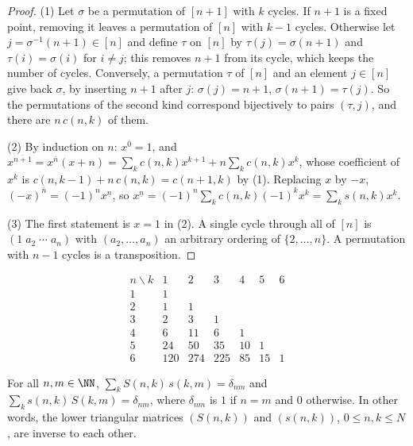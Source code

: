 \begin{proof}
(1) Let $\sigma$ be a permutation of $[n + 1]$ with $k$ cycles. If $n + 1$ is a fixed point, removing it leaves a permutation of $[n]$ with $k - 1$ cycles. Otherwise let $j = \sigma^{-1}(n + 1) \in [n]$ and
define $\tau$ on $[n]$ by $\tau(j) = \sigma(n + 1)$ and $\tau(i) = \sigma(i)$ for $i \neq j$; this removes $n + 1$ from its cycle, which keeps the number of cycles. Conversely, a permutation $\tau$ of $[n]$
and an element $j \in [n]$ give back $\sigma$, by inserting $n + 1$ after $j$: $\sigma(j) = n + 1$, $\sigma(n + 1) = \tau(j)$. So the permutations of the second kind correspond bijectively to pairs $(\tau, j)$,
and there are $n\,c(n, k)$ of them.

(2) By induction on $n$: $x^{\overline{0}} = 1$, and
$x^{\overline{n+1}} = x^{\overline{n}}(x + n) = \sum_kc(n, k)x^{k+1} + n\sum_kc(n, k)x^k$, whose coefficient of $x^k$ is $c(n, k - 1) + n\,c(n, k) = c(n + 1, k)$ by (1). Replacing $x$ by $-x$,
$(-x)^{\overline{n}} = (-1)^nx^{\underline{n}}$, so $x^{\underline{n}} = (-1)^n\sum_kc(n, k)(-1)^kx^k = \sum_ks(n, k)x^k$.

(3) The first statement is $x = 1$ in (2). A single cycle through all of $[n]$ is $(1 \; a_2 \; \cdots \; a_n)$ with $(a_2, \ldots, a_n)$ an arbitrary ordering of $\{2, \ldots, n\}$. A permutation with
$n - 1$ cycles is a transposition.
\end{proof}

\[
\begin{array}{c|cccccc}
n \backslash k & 1 & 2 & 3 & 4 & 5 & 6 \\ \hline
1 & 1 & & & & & \\
2 & 1 & 1 & & & & \\
3 & 2 & 3 & 1 & & & \\
4 & 6 & 11 & 6 & 1 & & \\
5 & 24 & 50 & 35 & 10 & 1 & \\
6 & 120 & 274 & 225 & 85 & 15 & 1
\end{array}
\]

\begin{corollary}[Orthogonality]\label{combinatorics:corollary-stirling-orthogonality}
For all $n, m \in \NN$, $\sum_kS(n, k)\,s(k, m) = \delta_{nm}$ and $\sum_ks(n, k)\,S(k, m) = \delta_{nm}$, where $\delta_{nm}$ is $1$ if $n = m$ and $0$ otherwise. In other words, the lower triangular
matrices $(S(n, k))$ and $(s(n, k))$, $0 \leq n, k \leq N$, are inverse to each other.
\end{corollary}

